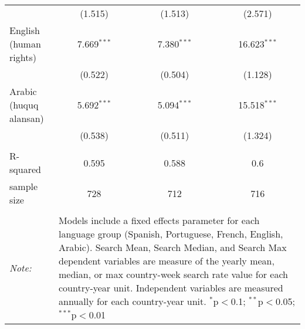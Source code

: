 \begin{table}[!htbp]
\begin{tabular}{@{\extracolsep{5pt}}lccc}
  & (1.515) & (1.513) & (2.571) \\ 
  English (human rights) & 7.669$^{***}$ & 7.380$^{***}$ & 16.623$^{***}$ \\ 
  & (0.522) & (0.504) & (1.128) \\ 
  Arabic (huquq alansan) & 5.692$^{***}$ & 5.094$^{***}$ & 15.518$^{***}$ \\ 
  & (0.538) & (0.511) & (1.324) \\ 
 \hline \\[-1.8ex] 
R-squared  & 0.595 & 0.588 & 0.6 \\ 
sample size  & 728 & 712 & 716 \\ 
\hline 
\hline \\[-1.8ex] 
\textit{Note:}  & \multicolumn{3}{l}{\parbox[t]{8cm}{Models include a fixed effects parameter for each language group (Spanish, Portuguese, French, English, Arabic). Search Mean, Search Median, and Search Max dependent variables are measure of the yearly mean, median, or max country-week search rate value for each country-year unit. Independent variables are measured annually for each country-year unit. $^{*}$p$<$0.1; $^{**}$p$<$0.05; $^{***}$p$<$0.01}} \\ 
\end{tabular} 
\end{table} 
